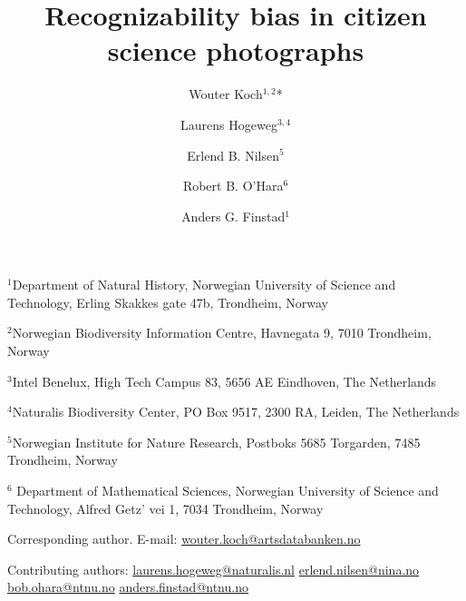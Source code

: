 \documentclass{article}
\begin{document}
\title{Recognizability bias in citizen science photographs}
\date{}
\author{
  Wouter Koch\(^{1,2}\)*
  \and
  Laurens Hogeweg\(^{3,4}\)
  \and
  Erlend B. Nilsen\(^{5}\)
  \and
  Robert B. O’Hara\(^{6}\)
  \and
  Anders G. Finstad\(^1\)}
\maketitle
\begin{center}
  {\footnotesize \(^1\)Department of Natural History, Norwegian University of Science and Technology, Erling Skakkes gate 47b, Trondheim, Norway}

  {\footnotesize \(^2\)Norwegian Biodiversity Information Centre, Havnegata 9, 7010 Trondheim, Norway}

  {\footnotesize \(^3\)Intel Benelux, High Tech Campus 83, 5656 AE Eindhoven, The Netherlands}

  {\footnotesize \(^4\)Naturalis Biodiversity Center, PO Box 9517, 2300 RA, Leiden, The Netherlands}

  {\footnotesize \(^5\)Norwegian Institute for Nature Research, Postboks 5685 Torgarden, 7485 Trondheim, Norway}

  {\footnotesize \(^6\) Department of Mathematical Sciences, Norwegian University of Science and Technology, Alfred Getz' vei 1, 7034 Trondheim, Norway}





  \center\parbox{200pt}{\normalsize\center *Corresponding author.
    E-mail:
    \href{mailto:wouter.koch@artsdatabanken.no}{wouter.koch@artsdatabanken.no}

    Contributing authors:
    \href{mailto:laurens.hogeweg@naturalis.nl}{laurens.hogeweg@naturalis.nl}
    \href{mailto:erlend.nilsen@nina.no}{erlend.nilsen@nina.no}
    \href{mailto:bob.ohara@ntnu.no}{bob.ohara@ntnu.no}
    \href{mailto:anders.finstad@ntnu.no}{anders.finstad@ntnu.no}}

\end{center}
\newpage
\justifying
\normalsize
\end{document}
